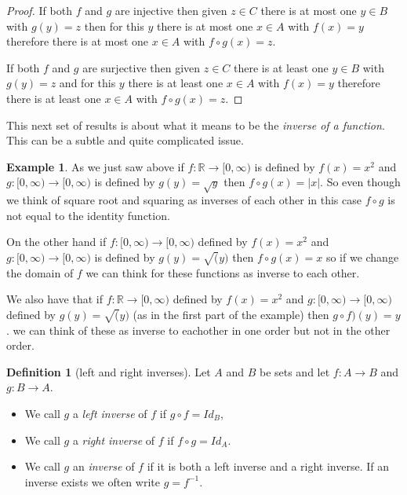 \documentclass[
]{book}
\theoremstyle{definition}
\newtheorem{definition}{Definition}[chapter]
\theoremstyle{definition}
\newtheorem{example}{Example}[chapter]
\theoremstyle{definition}
\theoremstyle{definition}
\theoremstyle{remark}
\begin{document}
\begin{proof}
If both \(f\) and \(g\) are injective then given \(z \in C\) there is at most one \(y \in B\) with \(g(y)=z\) then for this \(y\) there is at most one \(x \in A\) with \(f(x) = y\) therefore there is at most one \(x \in A\) with \(f\circ g(x) = z\).

If both \(f\) and \(g\) are surjective then given \(z \in C\) there is at least one \(y \in B\) with \(g(y) = z\) and for this \(y\) there is at least one \(x \in A\) with \(f(x) = y\) therefore there is at least one \(x \in A\) with \(f \circ g (x) = z\).
\end{proof}

This next set of results is about what it means to be the \emph{inverse of a function}. This can be a subtle and quite complicated issue.

\begin{example}
As we just saw above if \(f: \mathbb{R} \rightarrow [0,\infty)\) is defined by \(f(x) = x^2\) and \(g: [0,\infty) \rightarrow [0, \infty)\) is defined by \(g(y) = \sqrt{y}\) then \(f \circ g (x) = |x|\). So even though we think of square root and squaring as inverses of each other in this case \(f \circ g\) is not equal to the identity function.

On the other hand if \(f : [0, \infty) \rightarrow [0, \infty)\) defined by \(f(x)=x^2\) and \(g: [0,\infty) \rightarrow [0,\infty)\) is defined by \(g(y) = \sqrt(y)\) then \(f \circ g(x) = x\) so if we change the domain of \(f\) we can think for these functions as inverse to each other.

We also have that if \(f: \mathbb{R} \rightarrow [0,\infty)\) defined by \(f(x) = x^2\) and \(g: [0, \infty) \rightarrow [0,\infty)\) defined by \(g(y) = \sqrt(y)\) (as in the first part of the example) then \(g\circ f)(y) = y\). we can think of these as inverse to eachother in one order but not in the other order.
\end{example}

\begin{definition}[left and right inverses]

Let \(A\) and \(B\) be sets and let \(f: A \rightarrow B\) and \(g: B \rightarrow A\).

\begin{itemize}
\item
  We call \(g\) a \emph{left inverse} of \(f\) if \(g\circ f = Id_B\),
\item
  We call \(g\) a \emph{right inverse} of \(f\) if \(f\circ g = Id_A\).
\item
  We call \(g\) an \emph{inverse} of \(f\) if it is both a left inverse and a right inverse. If an inverse exists we often write \(g = f^{-1}\).
\end{itemize}

\end{definition}
\end{document}
